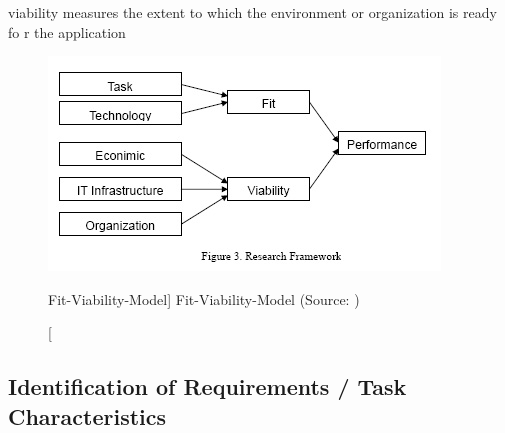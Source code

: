 viability  measures the extent to which the environment or organization is ready fo r the application



\begin{figure}[ht]
    \includegraphics[width=0.7\linewidth]{images/methodology/fvm.jpg}\centering
    \caption
    [Fit-Viability-Model]
    {Fit-Viability-Model (Source: \cite{Liang2007AdoptionModel})}
\end{figure}


\subsection{Identification of Requirements / Task Characteristics}

